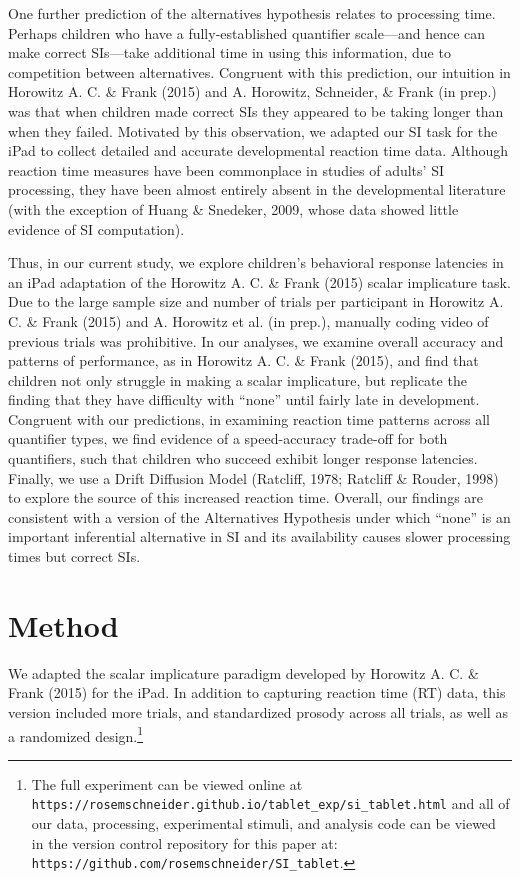 \documentclass[10pt, letterpaper]{article}
\begin{document}
One further prediction of the alternatives hypothesis relates to
processing time. Perhaps children who have a fully-established
quantifier scale---and hence can make correct SIs---take additional time
in using this information, due to competition between alternatives.
Congruent with this prediction, our intuition in Horowitz A. C. \& Frank
(2015) and A. Horowitz, Schneider, \& Frank (in prep.) was that when
children made correct SIs they appeared to be taking longer than when
they failed. Motivated by this observation, we adapted our SI task for
the iPad to collect detailed and accurate developmental reaction time
data. Although reaction time measures have been commonplace in studies
of adults' SI processing, they have been almost entirely absent in the
developmental literature (with the exception of Huang \& Snedeker, 2009,
whose data showed little evidence of SI computation).

Thus, in our current study, we explore children's behavioral response
latencies in an iPad adaptation of the Horowitz A. C. \& Frank (2015)
scalar implicature task. Due to the large sample size and number of
trials per participant in Horowitz A. C. \& Frank (2015) and A. Horowitz
et al. (in prep.), manually coding video of previous trials was
prohibitive. In our analyses, we examine overall accuracy and patterns
of performance, as in Horowitz A. C. \& Frank (2015), and find that
children not only struggle in making a scalar implicature, but replicate
the finding that they have difficulty with ``none'' until fairly late in
development. Congruent with our predictions, in examining reaction time
patterns across all quantifier types, we find evidence of a
speed-accuracy trade-off for both quantifiers, such that children who
succeed exhibit longer response latencies. Finally, we use a Drift
Diffusion Model (Ratcliff, 1978; Ratcliff \& Rouder, 1998) to explore
the source of this increased reaction time. Overall, our findings are
consistent with a version of the Alternatives Hypothesis under which
``none'' is an important inferential alternative in SI and its
availability causes slower processing times but correct SIs.

\section{Method}\label{method}

We adapted the scalar implicature paradigm developed by Horowitz A. C.
\& Frank (2015) for the iPad. In addition to capturing reaction time
(RT) data, this version included more trials, and standardized prosody
across all trials, as well as a randomized
design.\footnote{The full experiment can be viewed online at \texttt{https://rosemschneider.github.io/tablet\_exp/si\_tablet.html} and all of our data, processing, experimental stimuli, and analysis code can be viewed in the version control repository for this paper at: \texttt{https://github.com/rosemschneider/SI\_tablet}.}
\end{document}
